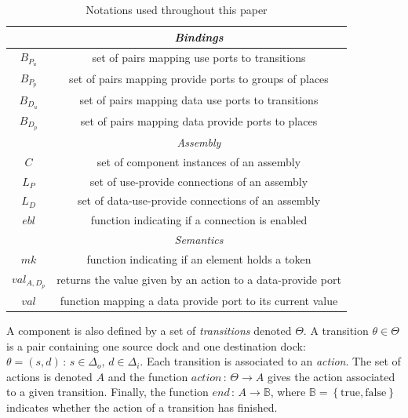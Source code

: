 {\begin{table}[tp]
{\begin{tabular}{|c|c|}
      \hline
      \hline
      & \emph{Bindings}\\
      \hline
      $B_{P_{u}}$ & set of pairs mapping use ports to transitions\\
      $B_{P_{p}}$ & set of pairs mapping provide ports to groups of places\\
      $B_{D_{u}}$ & set of pairs mapping data use ports to transitions\\
      $B_{D_{p}}$ & set of pairs mapping data provide ports to places\\
      \hline
      \hline
      & \emph{Assembly}\\
      \hline
      $C$ & set of component instances of an assembly\\
      $L_{P}$ & set of use-provide connections of an assembly\\
      $L_{D}$ & set of data-use-provide connections of an assembly\\
      $ebl$ & function indicating if a connection is enabled\\
      \hline
      \hline
      & \emph{Semantics}\\
      \hline
      $mk$ & function indicating if an element holds a token\\
      $val_{A,D_p}$ & returns the value given by an action to a data-provide port\\
      $val$ & function mapping a data provide port to its current value\\
      \hline
    \end{tabular}
  }
  \caption{Notations used throughout this paper}
  \label{tab:not}
\end{table}
A component is also defined by a set of \emph{transitions} denoted
$\Theta$. A transition $\theta \in \Theta$ is a pair containing one
source dock and one destination dock: $\theta =
\left(s,d\right)\,:\,s\in\Delta_{o},\,d\in\Delta_{i}$. 
%
Each transition is associated to an \emph{action}. The set of actions is
denoted $A$ and the function $action\,:\,\Theta\rightarrow A$ gives the action
associated to a given transition. Finally, the function
$end\,:\,A\rightarrow\mathbb{B}$, where $\mathbb{B}=\left\{
\text{true},\text{false}\right\}$ indicates whether the action of a
transition has finished.
  
}

